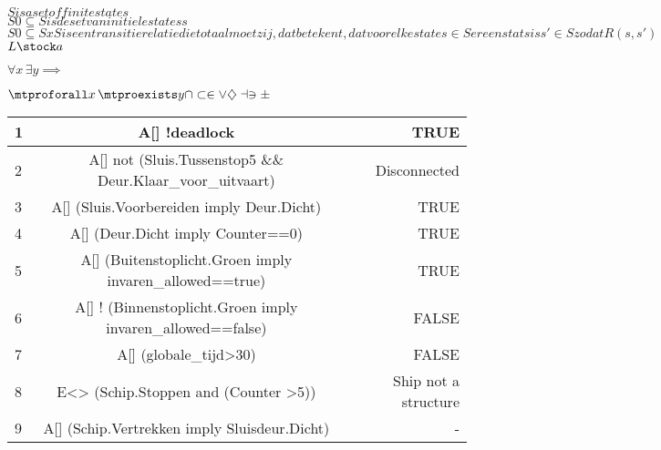  
 
 
 
 $S is a set of finite states$\\
 $S0 \subseteq S is de set van initiele statess$ \\
 $S0 \subseteq S xS  is een transitie relatie die totaal moet zij, dat betekent, dat voor elke state s \in S er een stats is s' \in S zodat R(s,s')$
 $L\stock a$
 
 $\forall x\,\exists y \implies $
 
 $\mtproforall x\,\mtproexists y \cap \subset \in \vee \diamondsuit \dashv \ni \pm$
 
 
 
 \begin{center}
 	\begin{tabular}{| l | c || r | }
 		\hline
 		1 &A[] !deadlock  &  TRUE \\ \hline
 		2 & A[] not (Sluis.Tussenstop5 \&\& Deur.Klaar\_voor\_uitvaart)  &  Disconnected \\ \hline
 		3 & A[]  (Sluis.Voorbereiden imply Deur.Dicht)   &  TRUE\\   \hline
 		4 &A[]  (Deur.Dicht imply Counter==0)   & TRUE  \\   \hline
 		5 & A[]  (Buitenstoplicht.Groen imply invaren\_allowed==true)  &  TRUE \\ \hline
 		6 & A[] ! (Binnenstoplicht.Groen imply invaren\_allowed==false)  & FALSE \\ \hline
 		7 & A[]  (globale\_tijd>30)   &  FALSE\\    \hline
 		8 & E<>  (Schip.Stoppen and (Counter >5))   & Ship not a structure  \\   \hline
 		9 & A[] (Schip.Vertrekken imply Sluisdeur.Dicht)  &  -  \\   \hline
 		\hline
 	\end{tabular}
 \end{center}
 
 
 
 
